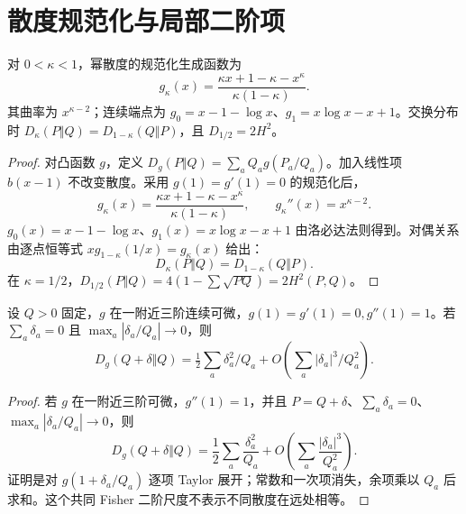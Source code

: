 \section{散度规范化与局部二阶项}
\begin{proposition}[幂散度的生成函数与对偶]
对 $0<\kappa<1$，幂散度的规范化生成函数为
\begin{equation}
g_\kappa(x)=\frac{\kappa x+1-\kappa-x^\kappa}{\kappa(1-\kappa)}.
\end{equation}
其曲率为 $x^{\kappa-2}$；连续端点为 $g_0=x-1-\log x$、$g_1=x\log x-x+1$。交换分布时 $D_\kappa(P\Vert Q)=D_{1-\kappa}(Q\Vert P)$，且 $D_{1/2}=2H^2$。
\end{proposition}
\begin{proof}
对凸函数 $g$，定义 $D_g(P\Vert Q)=\sum_aQ_ag(P_a/Q_a)$。加入线性项 $b(x-1)$ 不改变散度。采用 $g(1)=g'(1)=0$ 的规范化后，
\begin{equation}
g_\kappa(x)=\frac{\kappa x+1-\kappa-x^\kappa}{\kappa(1-\kappa)},
\qquad g_\kappa''(x)=x^{\kappa-2}.
\end{equation}
$g_0(x)=x-1-\log x$、$g_1(x)=x\log x-x+1$ 由洛必达法则得到。对偶关系由逐点恒等式 $xg_{1-\kappa}(1/x)=g_\kappa(x)$ 给出：
\begin{equation}
D_\kappa(P\Vert Q)=D_{1-\kappa}(Q\Vert P).
\end{equation}
在 $\kappa=1/2$，$D_{1/2}(P\Vert Q)=4(1-\sum\sqrt{PQ})=2H^2(P,Q)$。
\end{proof}

\begin{proposition}
设 $Q>0$ 固定，$g$ 在一附近三阶连续可微，$g(1)=g'(1)=0,g''(1)=1$。若 $\sum_a\delta_a=0$ 且 $\max_a|\delta_a/Q_a|\to0$，则
\begin{equation}
D_g(Q+\delta\Vert Q)=\tfrac12\sum_a\delta_a^2/Q_a
+O\!\left(\sum_a|\delta_a|^3/Q_a^2\right).
\end{equation}
\end{proposition}
\begin{proof}
若 $g$ 在一附近三阶可微，$g''(1)=1$，并且 $P=Q+\delta$、$\sum_a\delta_a=0$、$\max_a|\delta_a/Q_a|\to0$，则
\begin{equation}
D_g(Q+\delta\Vert Q)
=\frac12\sum_a\frac{\delta_a^2}{Q_a}
+O\left(\sum_a\frac{|\delta_a|^3}{Q_a^2}\right).
\end{equation}
证明是对 $g(1+\delta_a/Q_a)$ 逐项 Taylor 展开；常数和一次项消失，余项乘以 $Q_a$ 后求和。这个共同 Fisher 二阶尺度不表示不同散度在远处相等。
\end{proof}

